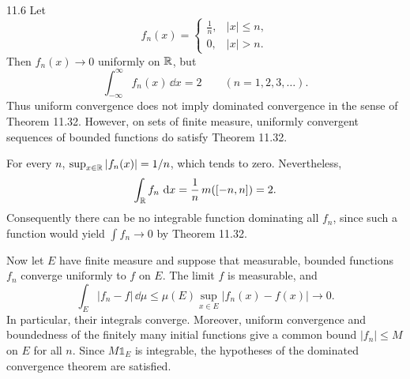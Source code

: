\documentclass[11pt,oneside]{article}
\begin{document}
\begin{exercise}{11.6}
Let
\[
 f_n(x)=\begin{cases}\frac1n,&|x|\le n,\\0,&|x|>n.\end{cases}
\]
Then $f_n(x)\to0$ uniformly on $\mathbb{R}$, but
\[
 \int_{-\infty}^{\infty}f_n(x)\,\dd x=2
 \qquad(n=1,2,3,\ldots).
\]
Thus uniform convergence does not imply dominated convergence in the sense of Theorem 11.32. However, on sets of finite measure, uniformly convergent sequences of bounded functions do satisfy Theorem 11.32.
\end{exercise}
\begin{solution}
For every $n$, $\sup_{x\in\mathbb{R}}|f_n(x)|=1/n$, which tends to zero. Nevertheless,
\[
 \int_{\mathbb{R}}f_n\,\mathop{}\!\mathrm{d} x=\frac1n\,m([-n,n])=2.
\]
Consequently there can be no integrable function dominating all $f_n$, since such a function would yield $\int f_n\to0$ by Theorem 11.32.

Now let $E$ have finite measure and suppose that measurable, bounded functions $f_n$ converge uniformly to $f$ on $E$. The limit $f$ is measurable, and
\[
 \int_E|f_n-f|\,\dd\mu
 \le\mu(E)\sup_{x\in E}|f_n(x)-f(x)|\longrightarrow0.
\]
In particular, their integrals converge. Moreover, uniform convergence and boundedness of the finitely many initial functions give a common bound $|f_n|\le M$ on $E$ for all $n$. Since $M\mathds{1}_E$ is integrable, the hypotheses of the dominated convergence theorem are satisfied.
\end{solution}
\end{document}
